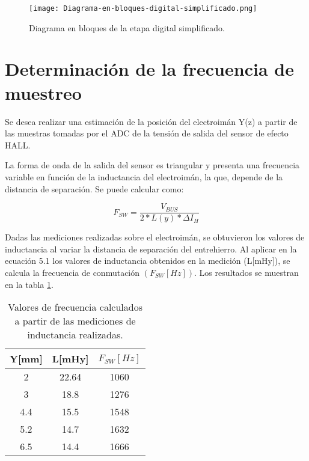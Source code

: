 \begin{figure}[H]
	\centering
	\texttt{[image: Diagrama-en-bloques-digital-simplificado.png]}
	\caption{Diagrama en bloques de la etapa digital simplificado.}
	\label{fig:diag-en-bloques-digital-simplif}
\end{figure}


\section{Determinación de la frecuencia de muestreo}

\noindent Se desea realizar una estimación de la posición del electroimán Y(z)  a partir de las muestras tomadas por el ADC de la tensión de salida del sensor de efecto HALL.

\noindent La forma de onda de la salida del sensor es triangular y presenta una frecuencia variable en función de la inductancia del electroimán, la que, depende de la distancia de separación. Se puede calcular como:

\begin{equation} 
	F_{SW}=\frac{V_{BUS}}{2 * L(y) * \Delta I_H}
\end{equation}

\noindent Dadas las mediciones realizadas sobre el electroimán, se obtuvieron los valores de inductancia al variar la distancia de separación del entrehierro. Al aplicar en la ecuación 5.1 los valores de inductancia obtenidos en la medición (L[mHy]), se calcula la frecuencia de conmutación  $(F_{SW}[Hz])$. Los resultados se muestran en la tabla \ref{frecuencias-calculadas}.


\begin{table}[H]
	\begin{center}
		\begin{tabular}{| c | c | c |}
			\hline
			Y[mm] & L[mHy] & $F_{SW}[Hz]$\\ \hline
			2 & 22.64 & 1060\\ \hline
			3 & 18.8 & 1276\\ \hline
			4.4 & 15.5 & 1548\\ \hline
			5.2 & 14.7 & 1632\\ \hline		
			6.5 & 14.4 & 1666\\ \hline
		\end{tabular}
		\caption{Valores de frecuencia calculados a partir de las mediciones de inductancia realizadas.}
		\label{frecuencias-calculadas}
	\end{center}
\end{table}


